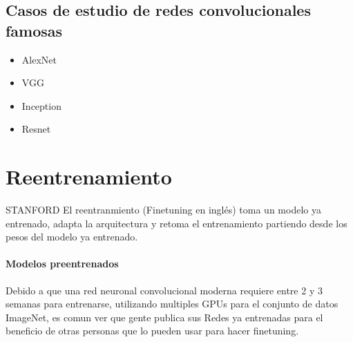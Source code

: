 \documentclass[a4paper,12pt,spanish]{book}
\begin{document}
    \subsection {Casos de estudio de redes convolucionales famosas}
      \begin{itemize}
	\item AlexNet
	\item VGG
	\item Inception
	\item Resnet
      \end{itemize}

    \section {Reentrenamiento}
    STANFORD
      El reentranmiento (Finetuning en inglés) toma un modelo ya entrenado, adapta la arquitectura y retoma el entrenamiento partiendo desde los pesos del modelo ya entrenado.
      \paragraph{Modelos preentrenados}
	Debido a que una red neuronal convolucional moderna requiere entre 2 y 3 semanas para entrenarse, utilizando multiples GPUs para el conjunto de datos ImageNet, es comun ver que gente
	publica sus Redes ya entrenadas para el beneficio de otras personas que lo pueden usar para hacer finetuning.
\end{document}
